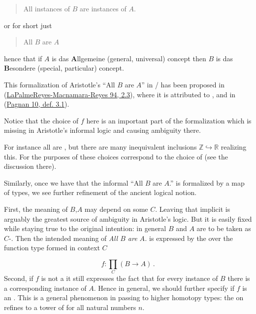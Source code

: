 \documentclass[12pt,titlepage]{article}
\theoremstyle{plain}
\theoremstyle{definition}
\theoremstyle{remark}
\begin{document}
\begin{quote}%
All instances of $B$ are instances of $A$.


\end{quote}
or for short just

\begin{quote}%
All $B$ are $A$


\end{quote}
hence that if $A$ is das \textbf{A}llgemeine (general, universal) concept then $B$ is das \textbf{B}esondere (special, particular) concept.

This formalization of Aristotle's ``All $B$ are $A$'' in / has been proposed in (\hyperlink{PalmeReyesMacnamaraReyes94}{LaPalmeReyes-Macnamara-Reyes 94, 2.3}), where it is attributed to , and in (\hyperlink{Pagnan10}{Pagnan 10, def. 3.1}).

Notice that the choice of $f$ here is an important part of the formalization which is missing in Aristotle's informal logic and causing ambiguity there.

For instance all  are , but there are many inequivalent  inclusions $\mathbb{Z}\hookrightarrow \mathbb{R}$ realizing this. For the purposes of  these choices correspond to the choice of  (see the discussion there).

Similarly, once we have that the informal ``All $B$ are $A$.'' is formalized by a map of types, we see further refinement of the ancient logical notion.

First, the meaning of $B$,$A$ may depend on some  $C$. Leaving that implicit is arguably the greatest source of ambiguity in Aristotle's logic. But it is easily fixed while staying true to the original intention: in general $B$ and $A$ are to be taken as $C$-. Then the intended meaning of \emph{All $B$ are $A$.} is expressed by the  over the function type formed in context $C$

\begin{displaymath}
f\colon \underset{C}{\prod} (B \longrightarrow A)
  \,.
\end{displaymath}
Second, if $f$ is not a  it still expresses the fact that for every instance of $B$ there is a corresponding instance of $A$. Hence in general, we should further specify if $f$ is an . This is a general phenomenon in passing to higher homotopy types: the  on  refines to a tower of  for all natural numbers $n$.
\end{document}
